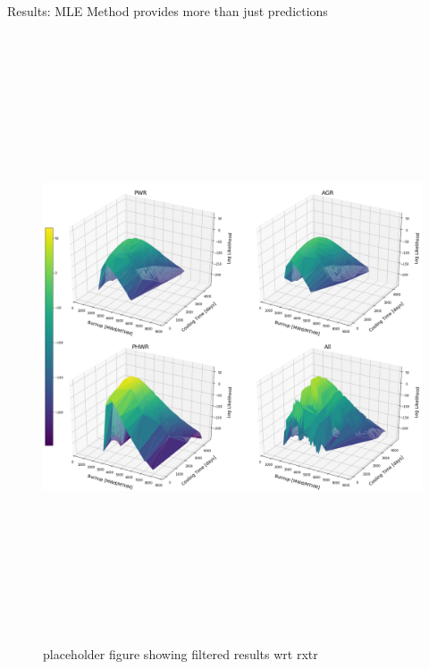\documentclass{beamer}
\begin{document}
\begin{frame}[t]{}
\begin{columns}
\begin{column}[T]{0.72\textwidth}
\begin{columns}[t]
\begin{column}{0.6\textwidth}
\begin{block}{Results: MLE Method provides more than just predictions}
\begin{figure}
\begin{minipage}{.5\textwidth}
  \centering
  \includegraphics[height=18cm]{figures/placeholder_rxtr.png}
  \caption{placeholder figure showing filtered results wrt rxtr}
\end{minipage}%
\begin{minipage}{.5\textwidth}
  \centering

\end{minipage}
\end{figure}
\end{block}
\end{column}
\end{columns}
\end{column}
\end{columns}
\end{frame}
\end{document}
